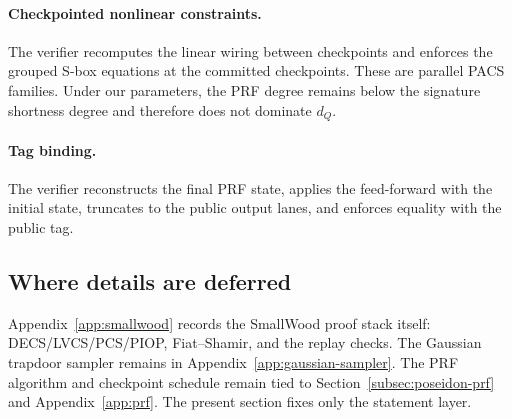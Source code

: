 \paragraph{Checkpointed nonlinear constraints.}
The verifier recomputes the linear wiring between checkpoints and enforces the
grouped S-box equations at the committed checkpoints. These are parallel PACS
families. Under our parameters, the PRF degree remains below the signature
shortness degree and therefore does not dominate \(d_Q\).

\paragraph{Tag binding.}
The verifier reconstructs the final PRF state, applies the feed-forward with
the initial state, truncates to the public output lanes, and enforces equality
with the public tag.

\subsection{Where details are deferred}
Appendix~\ref{app:smallwood} records the SmallWood proof stack itself:
DECS/LVCS/PCS/PIOP, Fiat--Shamir, and the replay checks. The Gaussian trapdoor
sampler remains in Appendix~\ref{app:gaussian-sampler}. The PRF algorithm and
checkpoint schedule remain tied to Section~\ref{subsec:poseidon-prf} and
Appendix~\ref{app:prf}. The present section fixes only the statement layer.
